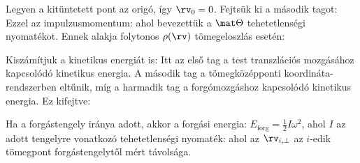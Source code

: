    Legyen a kitüntetett pont az origó, így $\rv_0=0$.
   Fejtsük ki a második tagot:
   Ezzel az impulzusmomentum:
   ahol bevezettük a $\mat\Theta$ tehetetlenségi nyomatékot.
   Ennek alakja folytonos $\rho(\rv)$ tömegeloszlás esetén:
   
   Kiszámítjuk a kinetikus energiát is:
   Itt az első tag a test transzlációs mozgásához kapcsolódó kinetikus energia.
   A második tag a tömegközépponti koordináta-rendszerben eltűnik, míg a harmadik tag a forgómozgáshoz kapcsolódó kinetikus energia.
   Ez kifejtve:
   
   Ha a forgástengely iránya adott, akkor a forgási energia: $E_\text{forg}=\frac 12 I\omega^2$, ahol $I$ az adott tengelyre vonatkozó tehetetlenségi nyomaték:
   ahol az $\rv_{i,\perp}$ az $i$-edik tömegpont forgástengelytől mért távolsága. 
   
